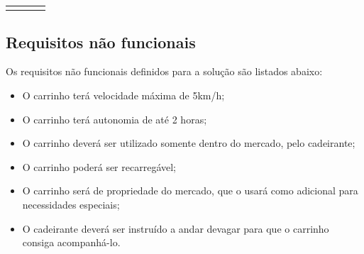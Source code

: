\begin{table}[h]
{\begin{tabular}{ l l l l }
{ \end{tabular} }
\end{table}

\newpage

\subsection{Requisitos não funcionais}

Os requisitos não funcionais definidos para a solução são listados abaixo:

\begin{itemize}
\item O carrinho terá velocidade máxima de 5km/h;
\item O carrinho terá autonomia de até 2 horas;
\item O carrinho deverá ser utilizado somente dentro do mercado, pelo cadeirante;
\item O carrinho poderá ser recarregável;
\item O carrinho será de propriedade do mercado, que o usará como adicional para necessidades especiais;
\item O cadeirante deverá ser instruído a andar devagar para que o carrinho consiga acompanhá-lo.
\end{itemize}




